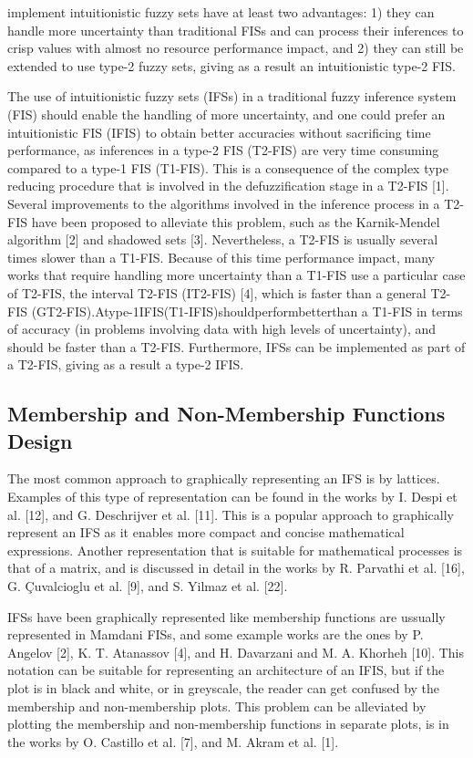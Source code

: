 implement intuitionistic fuzzy sets have at least two advantages: 1) they can handle more uncertainty than traditional FISs and can process their inferences to crisp values with almost no resource performance impact, and 2) they can still be extended to use type-2 fuzzy sets, giving as a result an intuitionistic type-2 FIS.

The use of intuitionistic fuzzy sets (IFSs) in a traditional fuzzy inference system (FIS) should enable the handling of more uncertainty, and one could prefer an intuitionistic FIS (IFIS) to obtain better accuracies without sacriﬁcing time performance, as inferences in a type-2 FIS (T2-FIS) are very time consuming compared to a type-1 FIS (T1-FIS). This is a consequence of the complex type reducing procedure that is involved in the defuzziﬁcation stage in a T2-FIS [1]. Several improvements to the algorithms involved in the inference process in a T2-FIS have been proposed to alleviate this problem, such as the Karnik-Mendel algorithm [2] and shadowed sets [3]. Nevertheless, a T2-FIS is usually several times slower than a T1-FIS. Because of this time performance impact, many works that require handling more uncertainty than a T1-FIS use a particular case of T2-FIS, the interval T2-FIS (IT2-FIS) [4], which is faster than a general T2-FIS (GT2-FIS).Atype-1IFIS(T1-IFIS)shouldperformbetterthan a T1-FIS in terms of accuracy (in problems involving data with high levels of uncertainty), and should be faster than a T2-FIS. Furthermore, IFSs can be implemented as part of a T2-FIS, giving as a result a type-2 IFIS.

\subsection{Membership and Non-Membership Functions Design}
\label{subsection:membership-and-non-membership-functions-design}

The most common approach to graphically representing an IFS is by lattices. Examples of this type of representation can be found in the works by I. Despi et al. [12], and G. Deschrijver et al. [11]. This is a popular approach to graphically represent an IFS as it enables more compact and concise mathematical expressions. Another representation that is suitable for mathematical processes is that of a matrix, and is discussed in detail in the works by R. Parvathi et al. [16],  G. Çuvalcioglu et al. [9], and S. Yilmaz et al. [22].

IFSs have been graphically represented like membership functions are ussually represented in Mamdani FISs, and some example works are the ones by P. Angelov [2], K. T. Atanassov [4], and H. Davarzani and M. A. Khorheh [10]. This notation can be suitable for representing an architecture of an IFIS, but if the plot is in black and white, or in greyscale, the reader can get confused by the membership and non-membership plots. This problem can be alleviated by plotting the membership and non-membership functions in separate plots, is in the works by O. Castillo et al. [7], and M. Akram et al. [1].

